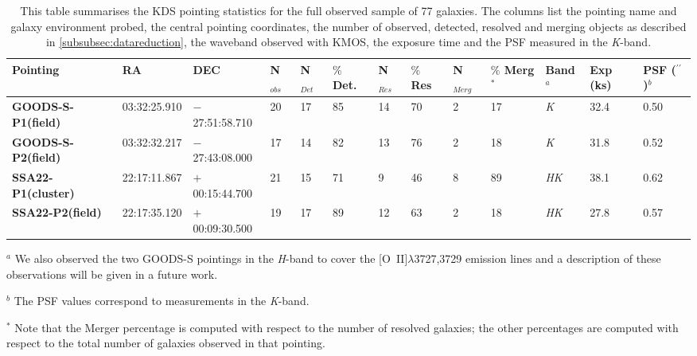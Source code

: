 \documentclass[fleqn,usenatbib]{mnras}
\begin{document}
\begin{table*}
\centering
\begin{threeparttable}
\caption{This table summarises the KDS pointing statistics for the full observed sample of 77 galaxies.
The columns list the pointing name and galaxy environment probed, the central pointing coordinates, the number of observed, detected, resolved and merging objects as described in \protect\cref{subsubsec:datareduction}, the waveband observed with KMOS, the exposure time and the PSF measured in the {\it K}-band.}
\label{tab:pointings}
\begin{tabular}{l l l l l l l l l l l l l}

 \hline
Pointing & RA & DEC & N$_{obs}$ & N$_{Det}$ & $\%$ Det. & N$_{Res}$ & $\%$ Res & N$_{Merg}$ & $\%$ Merg$^{*}$ & Band$^{a}$ & Exp (ks) & PSF ($^{\prime\prime}$)$^{b}$  \\
 \hline
 \scriptsize{\bf GOODS-S-P1(field)} & 03:32:25.910 & $-$27:51:58.710 & 20 & 17 & 85 & 14 & 70 & 2 & 17 & {\it K} & 32.4 & 0.50 \\
\scriptsize{\bf GOODS-S-P2(field)} & 03:32:32.217 & $-$27:43:08.000 & 17 & 14 & 82 & 13 & 76 & 2 & 18 & {\it K} & 31.8 & 0.52 \\
\scriptsize{\bf SSA22-P1(cluster)} & 22:17:11.867 & $+$00:15:44.700 & 21 & 15 & 71 & 9 & 46 & 8 & 89 & {\it HK} & 38.1 & 0.62 \\
\scriptsize{\bf SSA22-P2(field)} & 22:17:35.120 & $+$00:09:30.500 & 19 & 17 & 89 & 12 & 63 & 2 & 18 & {\it HK} & 27.8 & 0.57 \\

 \hline
\end{tabular}
\begin{tablenotes}
      \small
      \item $^{a}$ We also observed the two GOODS-S pointings in the {\it H}-band to cover the [O~{\sc II}]$\lambda$3727,3729 emission lines and a description of these observations will be given in a future work.
      \item $^{b}$ The PSF values correspond to measurements in the {\it K}-band.
      \item $^{*}$ Note that the Merger percentage is computed with respect to the number of resolved galaxies; the other percentages are computed with respect to the total number of galaxies observed in that pointing.
    \end{tablenotes}
  \end{threeparttable}
  \end{table*}
\end{document}
